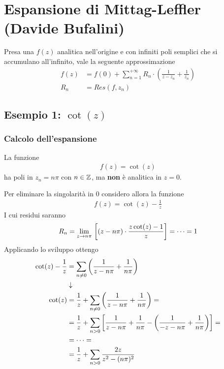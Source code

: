 \section{Espansione di Mittag-Leffler (Davide Bufalini)}

Presa una $f(z)$ analitica nell'origine e con infiniti poli semplici che si accumulano all'infinito, vale la seguente approssimazione
\begin{align}
	f(z) &= f(0) + \sum_{n=1}^{+\infty} R_n \cdot \left( \frac{1}{z-z_n} + \frac{1}{z_n} \right)\\
	R_n &= Res(f, z_n)
\end{align}


\subsection{Esempio 1: $\cot (z)$}

\subsubsection{Calcolo dell'espansione}

La funzione  
\begin{align}
	f(z) = \cot(z)
\end{align}
ha poli in $z_n = n\pi$ con $n\in \mathbb{Z}$, ma \textbf{non} è analitica in $z=0$.

Per eliminare la singolarità in 0 considero allora la funzione
\begin{align}
	f(z) = \cot(z) - \frac{1}{z}
\end{align}
I cui residui saranno
\begin{align}
	R_n = \underset{z \rightarrow n\pi}{\lim} \, \left[ (z-n\pi) \cdot \frac{z\cot(z) -1}{z} \right] = \dots = 1  
\end{align}
Applicando lo sviluppo ottengo
\begin{align}
	\cot(z) - \frac{1}{z} &= \sum_{n\neq 0} \left( \frac{1}{z-n\pi} + \frac{1}{n\pi}\right) \\ &\downarrow \nonumber \\
	\cot(z) &= \frac{1}{z} + \sum_{n\neq 0} \left( \frac{1}{z-n\pi} + \frac{1}{n\pi}\right) = \nonumber\\
	&= \frac{1}{z} + \sum_{n>0} \left[ \frac{1}{z-n\pi} + \frac{1}{n\pi} - \left( \frac{1}{-z-n\pi} + \frac{1}{n\pi} \right) \right] = \nonumber\\
	&= \dots  = \nonumber\\
	&= \frac{1}{z} + \sum_{n>0} \frac{2z}{z^2 - (n\pi)^2}
\end{align}

\newpage

